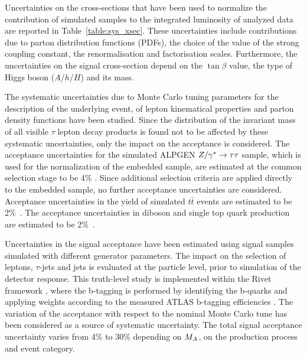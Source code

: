Uncertainties on the cross-sections that have been used to normalize
the contribution of simulated samples to the integrated luminosity of analyzed data are reported in
Table~\ref{table:sys_xsec}. These
uncertainties include contributions due to parton distribution
functions (PDFs), the choice of the value of the strong coupling constant,
the renormalisation and factorisation scales.  Furthermore, the
uncertainties on the signal cross-section depend on the  $\tan\beta$ value, the type of  
Higgs boson ($A$/$h$/$H$) and its mass.

The  systematic uncertainties due to Monte Carlo tuning
parameters for the description of the  underlying event,
of lepton kinematical properties and parton density functions have been studied.
Since the distribution of the invariant mass of all visible $\tau$ lepton decay 
products is found not to be affected by these systematic uncertainties,
only the impact on the acceptance is considered.
The acceptance uncertainties for the simulated ALPGEN $Z/\gamma^*\rightarrow \tau\tau$  sample, which is 
used for the normalization of the embedded sample, 
are estimated at the common selection stage to be 4\% \cite{2010SMLLSupportNote}.
Since additional selection criteria  are applied directly to the embedded sample, 
no further acceptance uncertainties are considered. Acceptance uncertainties in the yield of 
simulated $t\bar{t}$ events are estimated to be  2\%~\cite{ttbaremu}. %
The acceptance uncertainties in diboson and single top quark production are estimated to be 2\%~\cite{2010SMLLSupportNote}.

Uncertainties in the signal acceptance have been estimated using signal 
samples simulated with different generator parameters. The impact on the selection
 of leptons, $\tau$-jets  and jets is evaluated at the particle level, prior to 
simulation of the detector response. This truth-level study is implemented within the Rivet framework
\cite{RIVET}, where the b-tagging is performed by identifying the b-quarks and applying
 weights according to the measured ATLAS b-tagging
efficiencies \cite{BtaggingScaleFactors}. The variation of the acceptance
with respect to the nominal Monte Carlo tune has  been considered as
a source of systematic uncertainty. The total signal acceptance 
uncertainty varies from 4\% to 30\% depending on $M_{A}$, on the production process 
and event category.

